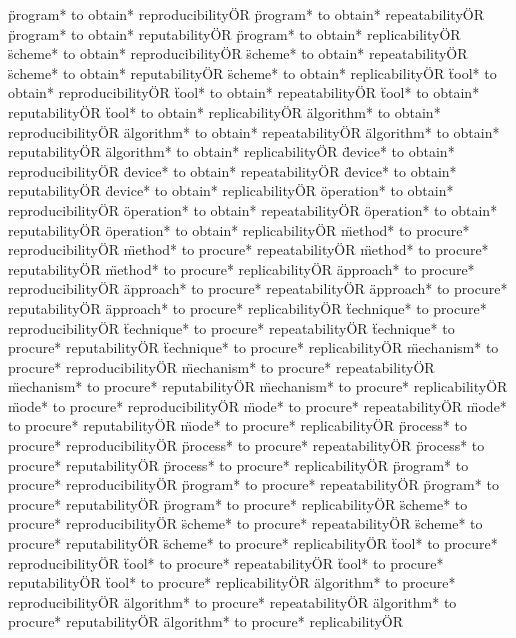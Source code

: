 \documentclass[
10pt, %
a4paper, %
oneside, %
headinclude,footinclude, %
BCOR5mm, %
]{scrartcl}
\begin{document}
\"program* to obtain* reproducibility\" OR \"program* to obtain* repeatability\" OR \"program* to obtain* reputability\" OR \"program* to obtain* replicability\" OR 
\"scheme* to obtain* reproducibility\" OR \"scheme* to obtain* repeatability\" OR \"scheme* to obtain* reputability\" OR \"scheme* to obtain* replicability\" OR 
\"tool* to obtain* reproducibility\" OR \"tool* to obtain* repeatability\" OR \"tool* to obtain* reputability\" OR \"tool* to obtain* replicability\" OR 
\"algorithm* to obtain* reproducibility\" OR \"algorithm* to obtain* repeatability\" OR \"algorithm* to obtain* reputability\" OR \"algorithm* to obtain* replicability\" OR 
\"device* to obtain* reproducibility\" OR \"device* to obtain* repeatability\" OR \"device* to obtain* reputability\" OR \"device* to obtain* replicability\" OR 
\"operation* to obtain* reproducibility\" OR \"operation* to obtain* repeatability\" OR \"operation* to obtain* reputability\" OR \"operation* to obtain* replicability\" OR 
\"method* to procure* reproducibility\" OR \"method* to procure* repeatability\" OR \"method* to procure* reputability\" OR \"method* to procure* replicability\" OR 
\"approach* to procure* reproducibility\" OR \"approach* to procure* repeatability\" OR \"approach* to procure* reputability\" OR \"approach* to procure* replicability\" OR 
\"technique* to procure* reproducibility\" OR \"technique* to procure* repeatability\" OR \"technique* to procure* reputability\" OR \"technique* to procure* replicability\" OR 
\"mechanism* to procure* reproducibility\" OR \"mechanism* to procure* repeatability\" OR \"mechanism* to procure* reputability\" OR \"mechanism* to procure* replicability\" OR 
\"mode* to procure* reproducibility\" OR \"mode* to procure* repeatability\" OR \"mode* to procure* reputability\" OR \"mode* to procure* replicability\" OR 
\"process* to procure* reproducibility\" OR \"process* to procure* repeatability\" OR \"process* to procure* reputability\" OR \"process* to procure* replicability\" OR 
\"program* to procure* reproducibility\" OR \"program* to procure* repeatability\" OR \"program* to procure* reputability\" OR \"program* to procure* replicability\" OR 
\"scheme* to procure* reproducibility\" OR \"scheme* to procure* repeatability\" OR \"scheme* to procure* reputability\" OR \"scheme* to procure* replicability\" OR 
\"tool* to procure* reproducibility\" OR \"tool* to procure* repeatability\" OR \"tool* to procure* reputability\" OR \"tool* to procure* replicability\" OR 
\"algorithm* to procure* reproducibility\" OR \"algorithm* to procure* repeatability\" OR \"algorithm* to procure* reputability\" OR \"algorithm* to procure* replicability\" OR 
\end{document}
